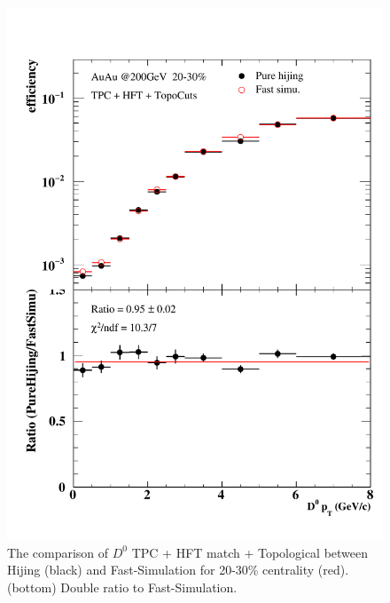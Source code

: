 \begin{figure}[htbp]
\begin{minipage}[htbp]{0.47\linewidth}
\includegraphics[width=1.0\textwidth,angle=0]{figure/Run14_D0HFT/20_30.pdf} 
\caption{ The comparison of $D^0$ TPC + HFT match + Topological between Hijing (black) and Fast-Simulation for 20-30\% centrality (red). (bottom) Double ratio to Fast-Simulation.\label{20_30}}
\end{minipage}
\end{figure}

